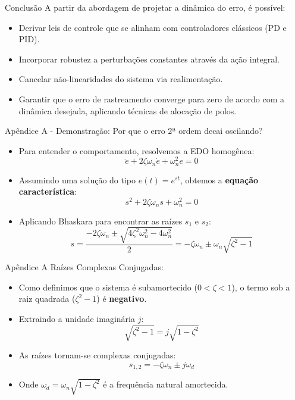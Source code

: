 \documentclass[11pt, aspectratio=169]{beamer}
\begin{document}

\begin{frame}{Conclusão}
    A partir da abordagem de projetar a dinâmica do erro, é possível:
    \begin{itemize}
        \item Derivar leis de controle que se alinham com controladores clássicos (PD e PID).
        \item Incorporar robustez a perturbações constantes através da ação integral.
        \item Cancelar não-linearidades do sistema via realimentação.
        \item Garantir que o erro de rastreamento converge para zero de acordo com a dinâmica desejada, aplicando técnicas de alocação de polos.
    \end{itemize}
\end{frame}

\begin{frame}{Apêndice A - Demonstração: Por que o erro 2ª ordem decai oscilando?}
    
    \begin{itemize}
        \item Para entender o comportamento, resolvemos a EDO homogênea:
        \[ \ddot{e} + 2\zeta\omega_n \dot{e} + \omega_n^2 e = 0 \]
        \item Assumindo uma solução do tipo $e(t) = e^{st}$, obtemos a \textbf{equação característica}:
        \[ s^2 + 2\zeta\omega_n s + \omega_n^2 = 0 \]
        \item Aplicando Bhaskara para encontrar as raízes $s_1$ e $s_2$:
        \[ s = \frac{-2\zeta\omega_n \pm \sqrt{4\zeta^2\omega_n^2 - 4\omega_n^2}}{2} = -\zeta\omega_n \pm \omega_n\sqrt{\zeta^2 - 1} \]
    \end{itemize}
\end{frame}

\begin{frame}{Apêndice A}
    \Large{Raízes Complexas Conjugadas:}
    \begin{itemize}
        \item Como definimos que o sistema é subamortecido ($0 < \zeta < 1$), o termo sob a raiz quadrada ($\zeta^2 - 1$) é \textbf{negativo}.
        \item Extraindo a unidade imaginária $j$:
        \[ \sqrt{\zeta^2 - 1} = j\sqrt{1 - \zeta^2} \]
        \item As raízes tornam-se complexas conjugadas:
        \[ s_{1,2} = -\zeta\omega_n \pm j\omega_d \]
        \item Onde $\omega_d = \omega_n\sqrt{1 - \zeta^2}$ é a frequência natural amortecida.
    \end{itemize}
\end{frame}
\end{document}
